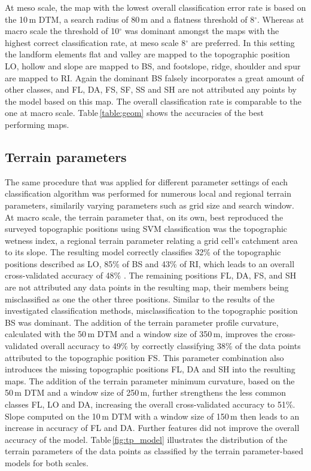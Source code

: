 \documentclass[preprint,12pt,authoryear]{elsarticle}
\begin{document}
At meso scale, the map with the lowest overall classification error rate is based on the 10\,m DTM, a search radius of 80\,m and a flatness threshold of 8$^{\circ}$. Whereas at macro scale the threshold of 10$^{\circ}$ was dominant amongst the maps with the highest correct classification rate, at meso scale 8$^{\circ}$ are preferred. In this setting the landform elements flat and valley are mapped to the topographic position LO, hollow and slope are mapped to BS, and footslope, ridge, shoulder and spur are mapped to RI. Again the dominant BS falsely incorporates a great amount of other classes, and FL, DA, FS, SF, SS and SH are not attributed any points by the model based on this map. The overall classification rate is comparable to the one at macro scale.  Table\,\ref{table:geom} shows the accuracies of the best performing maps.

\subsection{Terrain parameters}
The same procedure that was applied for different parameter settings of each classification algorithm was performed for  numerous local and regional terrain parameters, similarily varying parameters such as grid size and search window. At macro scale, the terrain parameter that, on its own, best reproduced the surveyed topographic positions using SVM classification was the topographic wetness index, a regional terrain parameter relating a grid cell's catchment area to its slope. The resulting model correctly classifies 32\% of the topographic positions described as LO, 85\% of BS and 43\% of RI, which leads to an overall cross-validated accuracy of 48\% . The remaining positions FL, DA, FS, and SH are not attributed any data points in the resulting map, their members being misclassified as one the other three positions. Similar to the results of the investigated classification methods, misclassification to the topographic position BS was dominant. The addition of the terrain parameter profile curvature, calculated with the 50\,m DTM and a window size of 350\,m, improves the cross-validated overall accuracy to 49\% by correctly classifying 38\% of the data points attributed to the topographic position FS. This parameter combination also introduces the missing topographic positions FL, DA and SH into the resulting maps. The addition of the terrain parameter minimum curvature, based on the 50\,m DTM and a window size of 250\,m, further strengthens the less common classes FL, LO and DA, increasing the overall cross-validated accuracy to 51\%. Slope computed on the 10\,m DTM with a window size of 150\,m then leads to an increase in accuracy of FL and DA. Further features did not improve the overall accuracy of the model. Table\,\ref{fig:tp_model} illustrates the distribution of the terrain parameters of the data points as classified by the terrain parameter-based models for both scales.
\end{document}

